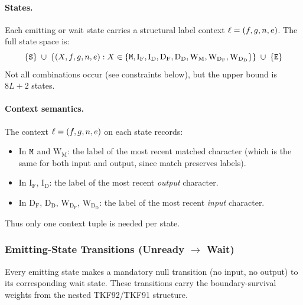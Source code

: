 \paragraph{States.}
Each emitting or wait state carries a structural label context $\ell = (f, g, n, e)$.
The full state space is:
\[
\{{\tt S}\} \;\cup\;
\{(X, f, g, n, e) : X \in \{{\tt M}, \mathrm{I_F}, \mathrm{I_D}, \mathrm{D_F}, \mathrm{D_D},
  \mathrm{W_M}, \mathrm{W_{D_F}}, \mathrm{W_{D_D}}\}\}
\;\cup\; \{{\tt E}\}
\]
Not all combinations occur (see constraints below), but the upper bound is $8L + 2$ states.

\paragraph{Context semantics.}
The context $\ell = (f, g, n, e)$ on each state records:
\begin{itemize}
\item In ${\tt M}$ and $\mathrm{W_M}$: the label of the most recent matched character
  (which is the same for both input and output, since match preserves labels).
\item In $\mathrm{I_F}$, $\mathrm{I_D}$: the label of the most recent \emph{output} character.
\item In $\mathrm{D_F}$, $\mathrm{D_D}$, $\mathrm{W_{D_F}}$, $\mathrm{W_{D_D}}$: the label of the most recent \emph{input} character.
\end{itemize}
Thus only one context tuple is needed per state.


\subsubsection{\texorpdfstring{Emitting-State Transitions (Unready $\to$ Wait)}{Emitting-State Transitions (Unready -> Wait)}}
\label{sec:emit-to-wait}

Every emitting state makes a mandatory null transition (no input, no output) to its
corresponding wait state. These transitions carry the boundary-survival weights from the
nested TKF92/TKF91 structure.

